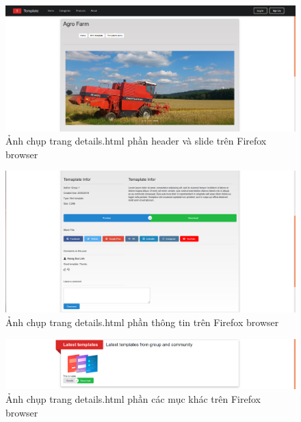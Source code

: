 \documentclass[a4paper]{article}
\begin{document}




\begin{figure}[H]
\begin{center}
\includegraphics[page=1, scale=0.215]{screenshot/firefox2.png}
\caption{Ảnh chụp trang details.html phần header và slide trên Firefox browser}
\end{center}
\end{figure}


\begin{figure}[H]
\begin{center}
\includegraphics[page=1, scale=0.215]{screenshot/firefox3.png}
\caption{Ảnh chụp trang details.html phần thông tin trên Firefox browser}
\end{center}
\end{figure}


\begin{figure}[H]
\begin{center}
\includegraphics[page=1, scale=0.215]{screenshot/firefox4.png}
\caption{Ảnh chụp trang details.html phần các mục khác trên Firefox browser}
\end{center}
\end{figure}
\end{document}
